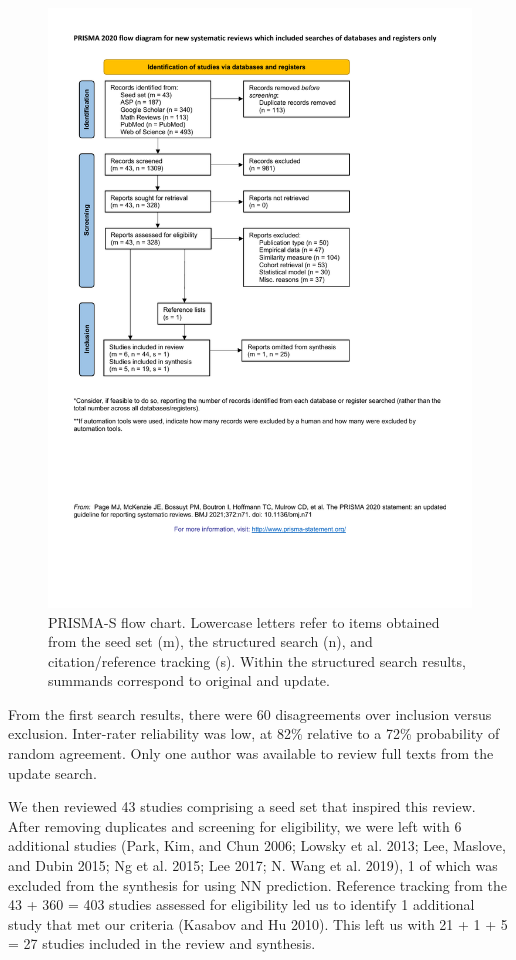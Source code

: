 \documentclass{article}
\begin{document}
\begin{figure}

{\centering \includegraphics[width=0.8\linewidth]{Fig1} 

}

\caption{PRISMA-S flow chart. Lowercase letters refer to items obtained from the seed set (m), the structured search (n), and citation/reference tracking (s). Within the structured search results, summands correspond to original and update.}\label{fig:prisma}
\end{figure}

From the first search results, there were 60 disagreements over
inclusion versus exclusion. Inter-rater reliability was low, at 82\%
relative to a 72\% probability of random agreement. Only one author was
available to review full texts from the update search.

We then reviewed 43 studies comprising a seed set that inspired this
review. After removing duplicates and screening for eligibility, we were
left with 6 additional studies (Park, Kim, and Chun 2006; Lowsky et al.
2013; Lee, Maslove, and Dubin 2015; Ng et al. 2015; Lee 2017; N. Wang et
al. 2019), 1 of which was excluded from the synthesis for using NN
prediction. Reference tracking from the 43 + 360 = 403 studies assessed
for eligibility led us to identify 1 additional study that met our
criteria (Kasabov and Hu 2010). This left us with 21 + 1 + 5 = 27
studies included in the review and synthesis.
\end{document}
